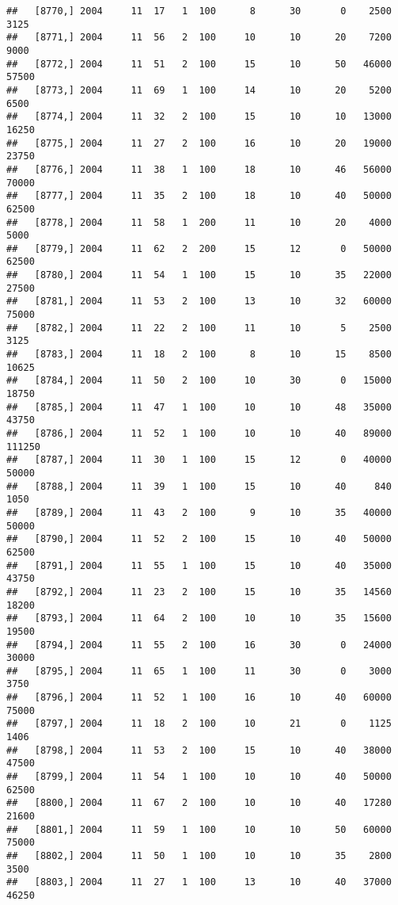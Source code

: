 \documentclass{article}\usepackage[]{graphicx}\usepackage[]{color}
\makeatletter
\newenvironment{kframe}{%
 \def\at@end@of@kframe{}%
 \ifinner\ifhmode%
  \def\at@end@of@kframe{\end{minipage}}%
  \begin{minipage}{\columnwidth}%
 \fi\fi%
 \def\FrameCommand##1{\hskip\@totalleftmargin \hskip-\fboxsep
 \colorbox{shadecolor}{##1}\hskip-\fboxsep
     \hskip-\linewidth \hskip-\@totalleftmargin \hskip\columnwidth}%
 \MakeFramed {\advance\hsize-\width
   \@totalleftmargin\z@ \linewidth\hsize
   \@setminipage}}%
 {\par\unskip\endMakeFramed%
 \at@end@of@kframe}
\newenvironment{knitrout}{}{} %
\makeatother
\begin{document}
\begin{knitrout}
\begin{kframe}
\begin{verbatim}
##   [8770,] 2004     11  17   1  100      8      30       0    2500    3125
##   [8771,] 2004     11  56   2  100     10      10      20    7200    9000
##   [8772,] 2004     11  51   2  100     15      10      50   46000   57500
##   [8773,] 2004     11  69   1  100     14      10      20    5200    6500
##   [8774,] 2004     11  32   2  100     15      10      10   13000   16250
##   [8775,] 2004     11  27   2  100     16      10      20   19000   23750
##   [8776,] 2004     11  38   1  100     18      10      46   56000   70000
##   [8777,] 2004     11  35   2  100     18      10      40   50000   62500
##   [8778,] 2004     11  58   1  200     11      10      20    4000    5000
##   [8779,] 2004     11  62   2  200     15      12       0   50000   62500
##   [8780,] 2004     11  54   1  100     15      10      35   22000   27500
##   [8781,] 2004     11  53   2  100     13      10      32   60000   75000
##   [8782,] 2004     11  22   2  100     11      10       5    2500    3125
##   [8783,] 2004     11  18   2  100      8      10      15    8500   10625
##   [8784,] 2004     11  50   2  100     10      30       0   15000   18750
##   [8785,] 2004     11  47   1  100     10      10      48   35000   43750
##   [8786,] 2004     11  52   1  100     10      10      40   89000  111250
##   [8787,] 2004     11  30   1  100     15      12       0   40000   50000
##   [8788,] 2004     11  39   1  100     15      10      40     840    1050
##   [8789,] 2004     11  43   2  100      9      10      35   40000   50000
##   [8790,] 2004     11  52   2  100     15      10      40   50000   62500
##   [8791,] 2004     11  55   1  100     15      10      40   35000   43750
##   [8792,] 2004     11  23   2  100     15      10      35   14560   18200
##   [8793,] 2004     11  64   2  100     10      10      35   15600   19500
##   [8794,] 2004     11  55   2  100     16      30       0   24000   30000
##   [8795,] 2004     11  65   1  100     11      30       0    3000    3750
##   [8796,] 2004     11  52   1  100     16      10      40   60000   75000
##   [8797,] 2004     11  18   2  100     10      21       0    1125    1406
##   [8798,] 2004     11  53   2  100     15      10      40   38000   47500
##   [8799,] 2004     11  54   1  100     10      10      40   50000   62500
##   [8800,] 2004     11  67   2  100     10      10      40   17280   21600
##   [8801,] 2004     11  59   1  100     10      10      50   60000   75000
##   [8802,] 2004     11  50   1  100     10      10      35    2800    3500
##   [8803,] 2004     11  27   1  100     13      10      40   37000   46250

\end{verbatim}
\end{kframe}
\end{knitrout}
\end{document}
